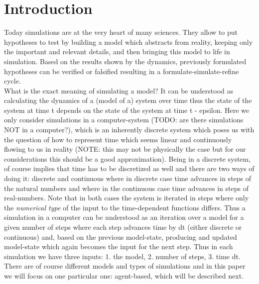 \section{Introduction}
Today simulations are at the very heart of many sciences. They allow to put hypotheses to test by building a model which abstracts from reality, keeping only the important and relevant details, and then bringing this model to life in simulation. Based on the results shown by the dynamics, previously formulated hypotheses can be verified or falsified resulting in a formulate-simulate-refine cycle. \\
What is the exact meaning of simulating a model? It can be understood as calculating the dynamics of a (model of a) system over time thus the state of the system at time t depends on the state of the system at time t - epsilon. Here we only consider simulations in a computer-system (TODO: are there simulations NOT in a computer?), which is an inherently discrete system which poses us with the question of how to represent time which seems linear and continuously flowing to us in reality (NOTE: this may not be physically the case but for our considerations this should be a good approximation). Being in a discrete system, of course implies that time has to be discretized as well and there are two ways of doing it: discrete and continuous where in discrete case time advances in steps of the natural numbers and where in the continuous case time advances in steps of real-numbers. Note that in both cases the system is iterated in steps where only the \textit{numerical type} of the input to the time-dependent functions differs. Thus a simulation in a computer can be understood as an iteration over a model for a given number of steps where each step advances time by dt (either discrete or continuous) and, based on the previous model-state, producing and updated model-state which again becomes the input for the next step. Thus in each simulation we have three inputs: 1. the model, 2. number of steps, 3. time dt. \\
There are of course different models and types of simulations and in this paper we will focus on one particular one: agent-based, which will be described next.

